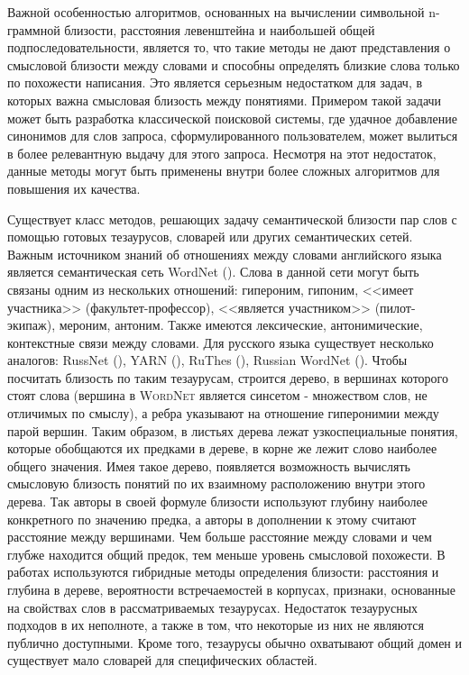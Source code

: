 Важной особенностью алгоритмов, основанных на вычислении символьной n-граммной близости, расстояния левенштейна и наибольшей общей подпоследовательности, является то, что такие методы не дают представления о смысловой близости между словами и способны определять близкие слова только по похожести написания. Это является серьезным недостатком для задач, в которых важна смысловая близость между понятиями. Примером такой задачи может быть разработка классической поисковой системы, где удачное добавление синонимов для слов запроса, сформулированного пользователем, может вылиться в более релевантную выдачу для этого запроса.  Несмотря на этот недостаток, данные методы могут быть применены внутри более сложных алгоритмов для повышения их качества.

Существует класс методов, решающих задачу семантической близости пар слов с помощью готовых тезаурусов, словарей или других семантических сетей. Важным источником знаний об отношениях между словами английского языка является семантическая сеть WordNet (\cite{wordnet}). Слова в данной сети могут быть связаны одним из нескольких отношений: гипероним, гипоним, <<имеет участника>> (факультет-профессор), <<является участником>> (пилот-экипаж), мероним, антоним. Также имеются лексические, антонимические, контекстные связи между словами. Для русского языка существует несколько аналогов: RussNet (\cite{russnet}), YARN (\cite{yarn, yarn_2}), RuThes (\cite{ruthes}), Russian WordNet (\cite{russian_wordnet}).  Чтобы посчитать близость по таким тезаурусам, строится дерево, в вершинах которого стоят слова (вершина в \textsc{WordNet} является синсетом - множеством слов, не отличимых по смыслу), а ребра указывают на отношение гиперонимии между парой вершин. Таким образом, в листьях дерева лежат узкоспециальные понятия, которые обобщаются их предками в дереве, в корне же лежит слово наиболее общего значения. Имея такое дерево, появляется возможность вычислять смысловую близость понятий по их взаимному расположению внутри этого дерева. Так авторы \cite{wordnet_sim_0} в своей формуле близости используют глубину наиболее конкретного по значению предка, а авторы  \cite{wordnet_sim_1} в дополнении к этому считают расстояние между вершинами. Чем больше расстояние между словами и чем глубже находится общий предок, тем меньше уровень смысловой похожести. В работах \cite{wordnet_hybrid_1,wordnet_hybrid_2} используются гибридные методы определения близости: расстояния и глубина в дереве, вероятности встречаемостей в корпусах, признаки, основанные на свойствах слов в рассматриваемых тезаурусах. Недостаток тезаурусных подходов в их неполноте, а также в том, что некоторые из них не являются публично доступными. Кроме того, тезаурусы обычно охватывают общий домен и существует мало словарей для специфических областей.

